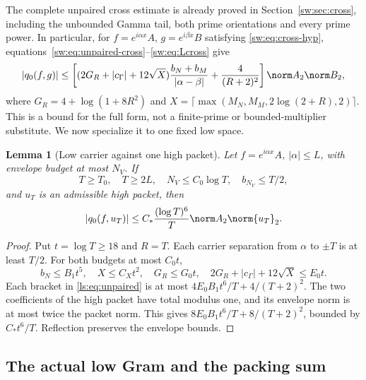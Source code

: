 \documentclass[11pt,a4paper]{article}
\numberwithin{equation}{section}
\newtheorem{lemma}[theorem]{Lemma}
\theoremstyle{definition}\newtheorem{definition}[theorem]{Definition}
\theoremstyle{remark}\newtheorem{remark}[theorem]{Remark}
\begin{document}
The complete unpaired cross estimate is already proved in
Section~\ref{sw:sec:cross}, including the unbounded Gamma tail, both
prime orientations and every prime power. In particular, for
$f=e^{i\alpha x}A$, $g=e^{i\beta x}B$ satisfying
\eqref{sw:eq:cross-hyp}, equations~\eqref{sw:eq:unpaired-cross}--\eqref{sw:eq:Lcross}
give
\begin{equation}\label{ls:eq:unpaired}
 |q_0(f,g)|\le
 \left[(2G_R+|c_\Gamma|+12\sqrt X)\frac{b_N+b_M}{|\alpha-\beta|}
       +\frac4{(R+2)^2}\right]\norm A_2\norm B_2,
\end{equation}
where $G_R=4+\log(1+8R^2)$ and
$X=\lceil\max(M_N,M_M,2\log(2+R),2)\rceil$.
This is a bound for the full form, not a finite-prime or bounded-multiplier
substitute. We now specialize it to one fixed low space.

\begin{lemma}[Low carrier against one high packet]\label{ls:lem:mixed}
Let $f=e^{i\alpha x}A$, $|\alpha|\le L$, with envelope budget at most
$N_V$. If
\[
 T\ge T_0,\quad T\ge2L,\quad N_V\le C_0\log T,\quad b_{N_V}\le T/2,
\]
and $u_T$ is an admissible high packet, then
\begin{equation}\label{ls:eq:one-cross}
 |q_0(f,u_T)|\le C_*\frac{(\log T)^6}{T}\norm A_2\norm{u_T}_2.
\end{equation}
\end{lemma}
\begin{proof}
Put $t=\log T\ge18$ and $R=T$. Each carrier separation from $\alpha$
to $\pm T$ is at least $T/2$. For both budgets at most $C_0t$,
\[
 b_N\le B_1t^5,\quad X\le C_Xt^2,\quad
 G_R\le G_0t,\quad 2G_R+|c_\Gamma|+12\sqrt X\le E_0t.
\]
Each bracket in \eqref{ls:eq:unpaired} is at most
$4E_0B_1t^6/T+4/(T+2)^2$. The two coefficients of the high packet
have total modulus one, and its envelope norm is at most twice the
packet norm. This gives $8E_0B_1t^6/T+8/(T+2)^2$, bounded by
$C_*t^6/T$. Reflection preserves the envelope bounds.
\end{proof}

\subsection{The actual low Gram and the packing sum}
\end{document}
